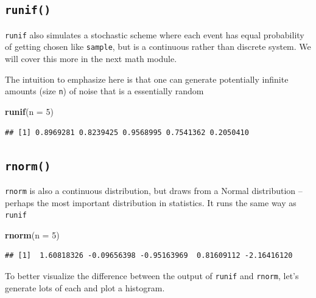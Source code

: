 \documentclass[
]{book}
\newenvironment{Shaded}{\begin{snugshade}}{\end{snugshade}}
\newcommand{\DataTypeTok}[1]{\textcolor[rgb]{0.13,0.29,0.53}{#1}}
\newcommand{\DecValTok}[1]{\textcolor[rgb]{0.00,0.00,0.81}{#1}}
\newcommand{\KeywordTok}[1]{\textcolor[rgb]{0.13,0.29,0.53}{\textbf{#1}}}
\newcommand{\NormalTok}[1]{#1}
\theoremstyle{definition}
\theoremstyle{definition}
\theoremstyle{definition}
\theoremstyle{definition}
\theoremstyle{remark}
\begin{document}
\hypertarget{runif}{%
\subsection*{\texorpdfstring{\texttt{runif()}}{runif()}}\label{runif}}

\texttt{runif} also simulates a stochastic scheme where each event has equal probability of getting chosen like \texttt{sample}, but is a continuous rather than discrete system. We will cover this more in the next math module.

The intuition to emphasize here is that one can generate potentially infinite amounts (size \texttt{n}) of noise that is a essentially random

\begin{Shaded}
\begin{Highlighting}[]
\KeywordTok{runif}\NormalTok{(}\DataTypeTok{n =} \DecValTok{5}\NormalTok{)}
\end{Highlighting}
\end{Shaded}

\begin{verbatim}
## [1] 0.8969281 0.8239425 0.9568995 0.7541362 0.2050410
\end{verbatim}

\hypertarget{rnorm}{%
\subsection*{\texorpdfstring{\texttt{rnorm()}}{rnorm()}}\label{rnorm}}

\texttt{rnorm} is also a continuous distribution, but draws from a Normal distribution -- perhaps the most important distribution in statistics. It runs the same way as \texttt{runif}

\begin{Shaded}
\begin{Highlighting}[]
\KeywordTok{rnorm}\NormalTok{(}\DataTypeTok{n =} \DecValTok{5}\NormalTok{)}
\end{Highlighting}
\end{Shaded}

\begin{verbatim}
## [1]  1.60818326 -0.09656398 -0.95163969  0.81609112 -2.16416120
\end{verbatim}

To better visualize the difference between the output of \texttt{runif} and \texttt{rnorm}, let's generate lots of each and plot a histogram.
\end{document}
